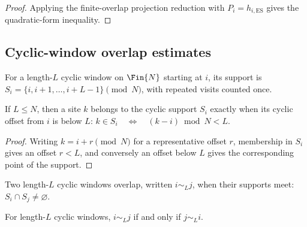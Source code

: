 \begin{proof}
    \leanok
    Applying the finite-overlap projection reduction with
    $P_i=h_{i,\mathrm{ES}}$ gives the quadratic-form inequality.
\end{proof}

\subsection{Cyclic-window overlap estimates}\label{subsec:spectral_gap_cyclic_overlap}

\begin{definition}
    \label{def:cyclic_window_support}
    \leanok
    For a length-$L$ cyclic window on $\Fin{N}$ starting at $i$, its support is
    $S_i=\{i,i+1,\ldots,i+L-1\}\pmod N$, with repeated visits counted once.
\end{definition}

\begin{lemma}
    \label{lem:cyclic_window_support_offsets}
    \leanok
    If $L\le N$, then a site $k$ belongs to the cyclic support $S_i$ exactly when
    its cyclic offset from $i$ is below $L$:
    $k\in S_i \quad\Longleftrightarrow\quad (k-i)\bmod N < L$.
\end{lemma}

\begin{proof}
    \leanok
    Writing $k=i+r\pmod N$ for a representative offset $r$, membership in
    $S_i$ gives an offset $r<L$, and conversely an offset below $L$ gives the
    corresponding point of the support.
\end{proof}

\begin{definition}
    \label{def:cyclic_windows_overlap}
    \leanok
    Two length-$L$ cyclic windows overlap, written $i\sim_L j$, when their
    supports meet: $S_i\cap S_j\ne\varnothing$.
\end{definition}

\begin{lemma}
    \label{lem:cyclic_windows_overlap_symmetry}
    \leanok
    For length-$L$ cyclic windows, $i\sim_Lj$ if and only if $j\sim_Li$.
\end{lemma}

